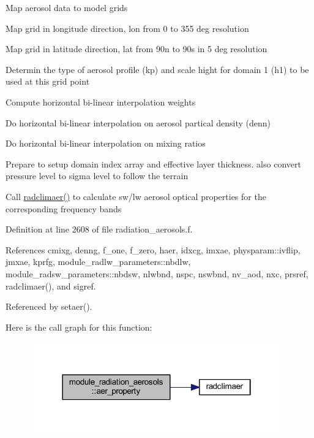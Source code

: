 \begin{DoxyEnumerate}
\item Map aerosol data to model grids
\begin{DoxyItemize}
\item Map grid in longitude direction, lon from 0 to 355 deg resolution
\item Map grid in latitude direction, lat from 90n to 90s in 5 deg resolution
\end{DoxyItemize}
\item Determin the type of aerosol profile (kp) and scale hight for domain 1 (h1) to be used at this grid point
\item Compute horizontal bi-\/linear interpolation weights
\item Do horizontal bi-\/linear interpolation on aerosol partical density (denn)
\item Do horizontal bi-\/linear interpolation on mixing ratios
\item Prepare to setup domain index array and effective layer thickness. also convert pressure level to sigma level to follow the terrain
\item Call \hyperlink{radiation__aerosols_8f_ae60b55ebc37825b2c3c95f95b23ed558}{radclimaer()} to calculate sw/lw aerosol optical properties for the corresponding frequency bands 
\end{DoxyEnumerate}

Definition at line 2608 of file radiation\+\_\+aerosols.\+f.



References cmixg, denng, f\+\_\+one, f\+\_\+zero, haer, idxcg, imxae, physparam\+::ivflip, jmxae, kprfg, module\+\_\+radlw\+\_\+parameters\+::nbdlw, module\+\_\+radsw\+\_\+parameters\+::nbdsw, nlwbnd, nspc, nswbnd, nv\+\_\+aod, nxc, prsref, radclimaer(), and sigref.



Referenced by setaer().



Here is the call graph for this function\+:
\nopagebreak
\begin{figure}[H]
\begin{center}
\leavevmode
\includegraphics[width=310pt]{namespacemodule__radiation__aerosols_a0c8525abbb12f5f03e3c136c851c11bd_cgraph}
\end{center}
\end{figure}




